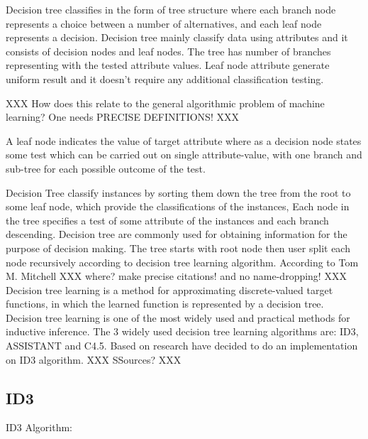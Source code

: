 \documentclass{article}
\begin{document}
Decision tree classifies in the form of tree structure where each branch node represents a choice between a number of alternatives, and each leaf node represents a decision. Decision tree mainly classify data using attributes and it consists of decision nodes and leaf nodes. The tree has number of branches representing with the tested attribute values. Leaf node attribute generate uniform result and it doesn't require any additional classification testing.

XXX How does this relate to the general algorithmic problem of machine learning? One needs PRECISE DEFINITIONS! XXX

A leaf node indicates the value of target attribute where as a decision node states some test which can be carried out on single attribute-value, with one branch and sub-tree for each possible outcome of the test.

Decision Tree classify instances by sorting them down the tree from the root to some leaf node, which provide the classifications of the instances, Each node in the tree specifies a test of some attribute of the instances and each branch descending.
Decision tree are commonly used for obtaining information for the purpose of decision making. The tree starts with root node then user split each node recursively according to decision tree learning algorithm.
According to Tom M. Mitchell XXX where? make precise citations! and no name-dropping! XXX Decision tree learning is a method for approximating discrete-valued target functions, in which the learned function is represented by a decision tree. Decision tree learning is one of the most widely used and practical methods for inductive inference. The 3 widely used decision tree learning algorithms are: ID3, ASSISTANT and C4.5. Based on research have decided to do an implementation on ID3 algorithm. XXX SSources? XXX


\subsection{ID3}
\label{sec:ID3}

ID3 Algorithm:
\end{document}
